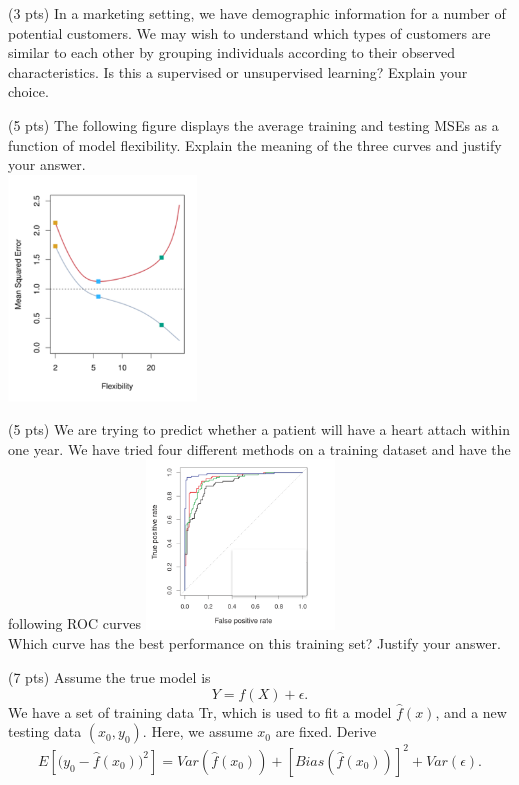 \documentclass[11pt,letter]{exam}
\begin{document}
\begin{questions}


\item (3 pts)   In a marketing setting, we have demographic information for a number of potential customers. We may wish to understand which types of customers are similar to each other by grouping individuals according to their observed characteristics. Is this a supervised or unsupervised learning? Explain your choice. 

\vspace{4 cm}

\item (5 pts) The following figure displays the average training and testing MSEs as a function of model flexibility. 
Explain the meaning of the three curves and justify your answer. \\
\includegraphics[width=5cm]{./Picture1.png}

\item (5 pts) We are trying to predict whether a patient will have a heart attach within one year. We have tried four different methods on a training dataset and have the following ROC curves
\includegraphics[width=5cm]{./Picture3.png}\\
Which curve has the best performance on this training set? Justify your answer.
\newpage
\item (7 pts) Assume the true model is 
\[ 
 Y = f(X) + \epsilon.
\]
We have a set of training data Tr, which is used to fit a model $\hat{f}(x)$, and a new testing data $(x_0, y_0)$. Here, we assume $x_0$ are fixed.
Derive 
\[
	   E \left[ \big( y_0 - \hat{f}(x_0) \big)^2 \right]  = Var(\hat{f}(x_0)) + [Bias( \hat{f}(x_0))]^2 + Var(\epsilon).
\]


\end{questions}
\end{document}
